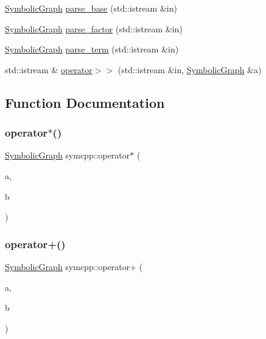 \begin{DoxyCompactItemize}
\mbox{\hyperlink{classsymcpp_1_1SymbolicGraph}{Symbolic\+Graph}} \mbox{\hyperlink{namespacesymcpp_ac1190508010160ccc9081fd72ec62813}{parse\+\_\+base}} (std\+::istream \&in)
\item 
\mbox{\hyperlink{classsymcpp_1_1SymbolicGraph}{Symbolic\+Graph}} \mbox{\hyperlink{namespacesymcpp_aa72aeab474894e16fb524965bd1a2d82}{parse\+\_\+factor}} (std\+::istream \&in)
\item 
\mbox{\hyperlink{classsymcpp_1_1SymbolicGraph}{Symbolic\+Graph}} \mbox{\hyperlink{namespacesymcpp_ab5470ea5b8d3a87476a1cbda0c3251d5}{parse\+\_\+term}} (std\+::istream \&in)
\item 
std\+::istream \& \mbox{\hyperlink{namespacesymcpp_a6223fff1711cd0a60f4346e55c602da8}{operator$>$$>$}} (std\+::istream \&in, \mbox{\hyperlink{classsymcpp_1_1SymbolicGraph}{Symbolic\+Graph}} \&a)
\end{DoxyCompactItemize}


\subsection{Function Documentation}
\mbox{\label{namespacesymcpp_a6d2e774f2cce2b171bea1416d772b833}} 
\subsubsection{\texorpdfstring{operator$\ast$()}{operator*()}}
{\footnotesize\ttfamily \mbox{\hyperlink{classsymcpp_1_1SymbolicGraph}{Symbolic\+Graph}} symcpp\+::operator$\ast$ (\begin{DoxyParamCaption}\item[{\mbox{\hyperlink{classsymcpp_1_1SymbolicGraph}{Symbolic\+Graph}}}]{a,  }\item[{const \mbox{\hyperlink{classsymcpp_1_1SymbolicGraph}{Symbolic\+Graph}} \&}]{b }\end{DoxyParamCaption})}

\mbox{\label{namespacesymcpp_a158d9eeff81ccfd1af9b8376ed2d05cc}} 
\subsubsection{\texorpdfstring{operator+()}{operator+()}}
{\footnotesize\ttfamily \mbox{\hyperlink{classsymcpp_1_1SymbolicGraph}{Symbolic\+Graph}} symcpp\+::operator+ (\begin{DoxyParamCaption}\item[{\mbox{\hyperlink{classsymcpp_1_1SymbolicGraph}{Symbolic\+Graph}}}]{a,  }\item[{const \mbox{\hyperlink{classsymcpp_1_1SymbolicGraph}{Symbolic\+Graph}} \&}]{b }\end{DoxyParamCaption})}

